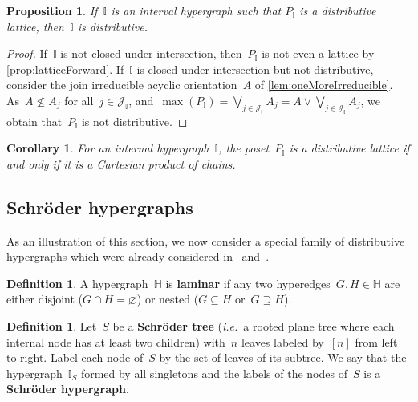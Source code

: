 \documentclass{amsart}
\newtheorem{corollary}[theorem]{Corollary}
\newtheorem{proposition}[theorem]{Proposition}
\theoremstyle{definition}
\newtheorem{definition}[theorem]{Definition}
\newcommand{\cal}[1]{\mathcal{#1}} %
\newcommand{\ie}{\textit{i.e.}~} %
\newcommand{\defn}[1]{\textbf{\textsf{\color{PineGreen} #1}}} %
\newcommand{\join}{\vee} %
\newcommand{\bigJoin}{\bigvee} %
\newcommand{\HH}{\mathbb H}  %
\newcommand{\II}{\mathbb I} %
\newcommand{\cJ}{\cal{J}} %
\begin{document}
\begin{proposition}
If~$\II$ is an interval hypergraph such that $P_\II$ is a distributive lattice, then~$\II$ is distributive.
\end{proposition}

\begin{proof}
If~$\II$ is not closed under intersection, then~$P_\II$ is not even a lattice by \cref{prop:latticeForward}.
If~$\II$ is closed under intersection but not distributive, consider the join irreducible acyclic orientation~$A$ of \cref{lem:oneMoreIrreducible}.
As~$A \not\le A_j$ for all~$j \in \cJ_\II$, and~$\max(P_\II) = \bigJoin_{j \in \cJ_\II} A_j = A \join \bigJoin_{j \in \cJ_\II} A_j$, we obtain that~$P_\II$ is not distributive.
\end{proof}

\begin{corollary}
For an internal hypergraph~$\II$, the poset~$P_\II$ is a distributive lattice if and only if it is a Cartesian product of chains.
\end{corollary}


\subsection{Schr\"oder hypergraphs}
\label{subsec:SchroderHypergraphs}

As an illustration of this section, we now consider a special family of distributive hypergraphs which were already considered in~\cite[Sect.~7.2]{PostnikovReinerWilliams} and~\cite{Defant-fertilitopes}.

\begin{definition}
A hypergraph~$\HH$ is \defn{laminar} if any two hyperedges~$G, H \in \HH$ are either disjoint ($G \cap H = \varnothing$) or nested ($G \subseteq H$ or~$G \supseteq H$).
\end{definition}

\begin{definition}
Let~$S$ be a \defn{Schr\"oder tree} (\ie a rooted plane tree where each internal node has at least two children) with~$n$ leaves labeled by~$[n]$ from left to right.
Label each node of~$S$ by the set of leaves of its subtree.
We say that the hypergraph~$\II_S$ formed by all singletons and the labels of the nodes of~$S$ is a \defn{Schr\"oder hypergraph}.
\end{definition}
\end{document}
